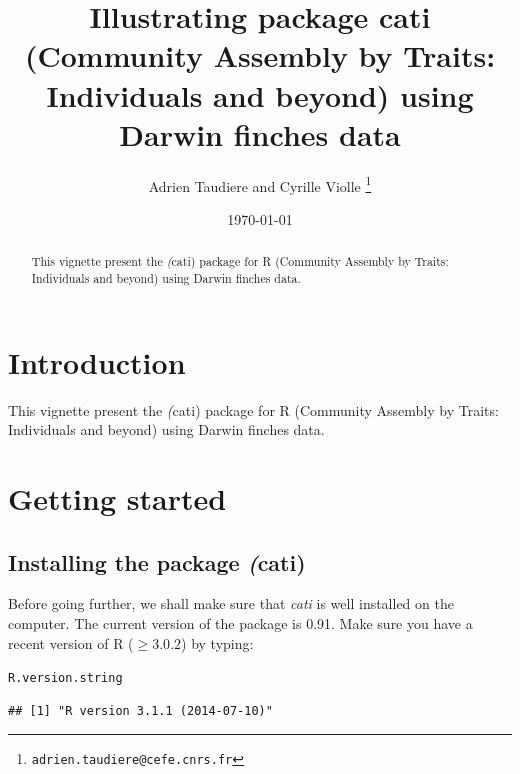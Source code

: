 \documentclass[12pt]{article}\usepackage[]{graphicx}\usepackage[]{color}
\title{Illustrating package cati (Community Assembly by Traits: Individuals and beyond) using Darwin finches data}
\author{Adrien Taudiere and Cyrille Violle
\thanks{\texttt{adrien.taudiere@cefe.cnrs.fr}}
}
\affil{{\footnotesize CEFE - Centre d'Ecologie Fonctionnelle et Evolutive, Montpellier: France}}
\date{\today}
\makeatletter
\newcommand{\hlstd}[1]{\textcolor[rgb]{0.345,0.345,0.345}{#1}}%
\newenvironment{kframe}{%
 \def\at@end@of@kframe{}%
 \ifinner\ifhmode%
  \def\at@end@of@kframe{\end{minipage}}%
  \begin{minipage}{\columnwidth}%
 \fi\fi%
 \def\FrameCommand##1{\hskip\@totalleftmargin \hskip-\fboxsep
 \colorbox{shadecolor}{##1}\hskip-\fboxsep
     \hskip-\linewidth \hskip-\@totalleftmargin \hskip\columnwidth}%
 \MakeFramed {\advance\hsize-\width
   \@totalleftmargin\z@ \linewidth\hsize
   \@setminipage}}%
 {\par\unskip\endMakeFramed%
 \at@end@of@kframe}
\newenvironment{knitrout}{}{} %
\makeatother
\begin{document}



\maketitle

\begin{abstract}
  This vignette present the \textit(cati) package for R (Community Assembly by Traits: Individuals and beyond) using Darwin finches data.
\end{abstract}

\newpage
\tableofcontents

\newpage


\section{Introduction}
This vignette present the \textit(cati) package for R (Community Assembly by Traits: Individuals and beyond) using Darwin finches data.

\section{Getting started}
\subsection{Installing the package \textit(cati)}

Before going further, we shall make sure that \textit{cati} is well installed
on the computer.
The current version of the package is 0.91.
Make sure you have a recent version of R ($\geq 3.0.2$) by typing:

\begin{knitrout}
\color{fgcolor}\begin{kframe}
\begin{alltt}
\hlstd{R.version.string}
\end{alltt}
\begin{verbatim}
## [1] "R version 3.1.1 (2014-07-10)"
\end{verbatim}
\end{kframe}
\end{knitrout}
\end{document}
